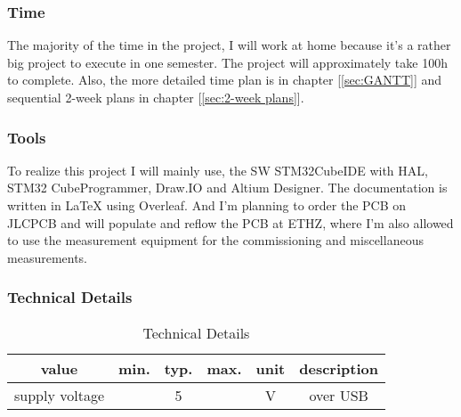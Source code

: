 \subsubsection{Time}
The majority of the time in the project, I will work at home because it's a rather big project to execute in one semester. The project will approximately take 100h to complete. Also, the more detailed time plan is in chapter [\ref{sec:GANTT}] and sequential 2-week plans in chapter [\ref{sec:2-week plans}].

\subsubsection{Tools}
To realize this project I will mainly use, the SW STM32CubeIDE with HAL, STM32 CubeProgrammer, Draw.IO and Altium Designer. The documentation is written in LaTeX using Overleaf. And I'm planning to order the PCB on JLCPCB and will populate and reflow the PCB at ETHZ, where I'm also allowed to use the measurement equipment for the commissioning and miscellaneous measurements.

\subsubsection{Technical Details}
\begin{table}[H]
    \centering
    \label{tab:Technical Details}
\begin{tabular}{||c || c | c | c | c  || c ||} 
 \hline
 value &  min. & typ. & max. & unit & description \\ [0.5ex] 
 \hline\hline
  supply voltage & & 5 & & V & over USB \\ 
 \hline
\end{tabular}
    \caption{Technical Details}
\end{table}

\newpage